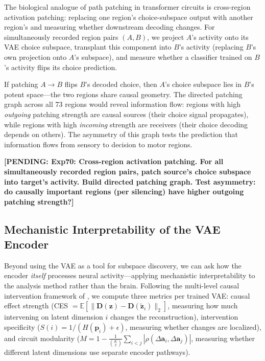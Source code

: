 \documentclass{article}
\newcommand{\pending}[1]{\textcolor{red!70!black}{\textbf{[PENDING: #1]}}}
\begin{document}
The biological analogue of path patching in transformer circuits \citep{geiger2024finding} is cross-region activation patching: replacing one region's choice-subspace output with another region's and measuring whether downstream decoding changes. For simultaneously recorded region pairs $(A, B)$, we project $A$'s activity onto its VAE choice subspace, transplant this component into $B$'s activity (replacing $B$'s own projection onto $A$'s subspace), and measure whether a classifier trained on $B$'s activity flips its choice prediction.

If patching $A \to B$ flips $B$'s decoded choice, then $A$'s choice subspace lies in $B$'s potent space---the two regions share causal geometry. The directed patching graph across all 73 regions would reveal information flow: regions with high \emph{outgoing} patching strength are causal sources (their choice signal propagates), while regions with high \emph{incoming} strength are receivers (their choice decoding depends on others). The asymmetry of this graph tests the prediction that information flows from sensory to decision to motor regions.

\pending{Exp70: Cross-region activation patching. For all simultaneously recorded region pairs, patch source's choice subspace into target's activity. Build directed patching graph. Test asymmetry: do causally important regions (per silencing) have higher outgoing patching strength?}

\subsection{Mechanistic Interpretability of the VAE Encoder}

Beyond using the VAE as a tool for subspace discovery, we can ask how the encoder \emph{itself} processes neural activity---applying mechanistic interpretability to the analysis method rather than the brain. Following the multi-level causal intervention framework of \citet{martinez2025vae_circuits}, we compute three metrics per trained VAE: causal effect strength (CES $= \mathbb{E}[\|\mathbf{D}(\mathbf{z}) - \mathbf{D}(\tilde{\mathbf{z}}_i)\|_2]$, measuring how much intervening on latent dimension $i$ changes the reconstruction), intervention specificity ($S(i) = 1/(H(\mathbf{p}_i) + \epsilon)$, measuring whether changes are localized), and circuit modularity ($M = 1 - \frac{1}{\binom{K}{2}}\sum_{i<j}|\rho(\Delta \mathbf{a}_i, \Delta \mathbf{a}_j)|$, measuring whether different latent dimensions use separate encoder pathways).
\end{document}
